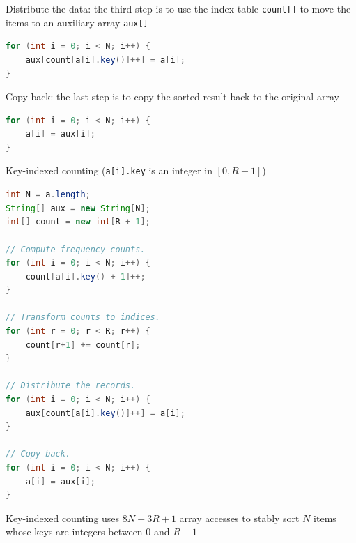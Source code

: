 \documentclass[8pt,a4paper,compress]{beamer}
\begin{document}
\begin{frame}[fragile]
\pause

Distribute the data: the third step is to use the index table \lstinline{count[]} to move the items to an auxiliary array \lstinline{aux[]}

\begin{lstlisting}[language=Java]
for (int i = 0; i < N; i++) {
    aux[count[a[i].key()]++] = a[i];
}
\end{lstlisting}

\begin{center}
\end{center}

\pause
\bigskip

Copy back: the last step is to copy the sorted result back to the original array

\begin{lstlisting}[language=Java]
for (int i = 0; i < N; i++) {
    a[i] = aux[i];
}
\end{lstlisting}
\end{frame}

\begin{frame}[fragile]
\pause

Key-indexed counting (\lstinline{a[i].key} is an integer in $[0, R-1]$)
\begin{lstlisting}[language=Java]
int N = a.length;
String[] aux = new String[N];
int[] count = new int[R + 1];

// Compute frequency counts.
for (int i = 0; i < N; i++) { 
    count[a[i].key() + 1]++;
}

// Transform counts to indices.
for (int r = 0; r < R; r++) {
    count[r+1] += count[r];
}

// Distribute the records.
for (int i = 0; i < N; i++) {
    aux[count[a[i].key()]++] = a[i];
}

// Copy back.
for (int i = 0; i < N; i++) {
    a[i] = aux[i];
}
\end{lstlisting}

\pause
\bigskip

Key-indexed counting uses $8N + 3R + 1$ array accesses to stably
sort $N$ items whose keys are integers between 0 and $R - 1$
\end{frame}
\end{document}
